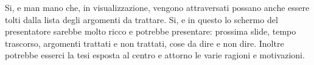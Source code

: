 \chrule
{}%
{Si, e man mano che, in visualizzazione, vengono attraversati possano anche essere tolti dalla lista degli argomenti da trattare.}
\chrule
{}%
{Si, e in questo lo schermo del presentatore sarebbe molto ricco e potrebbe presentare: prossima slide, tempo trascorso, argomenti trattati e 
non trattati, cose da dire e non dire. Inoltre potrebbe esserci la tesi esposta al centro e attorno le varie ragioni e motivazioni.}
